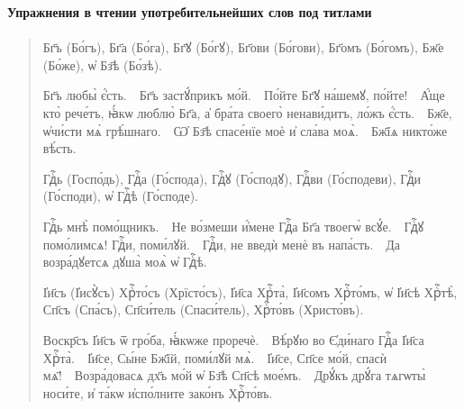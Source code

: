 \documentclass[11pt,a4paper,oneside]{memoir}
\newcommand{\exercise}{}
\newcommand{\exquote}{quote}
\newcommand{\pstyle}{\textenglish}
\newcommand{\pxp}[1]{\pstyle{(}#1\pstyle{)}}
\newcommand{\sdash}{\textenglish{\textemdash}}
\begin{document}
        \textbf{Упражнения в чтении употребительнейших слов под титлами}

        \paragraph{\exercise}

        \begin{\exquote}
          \begin{slv}
            Бг҃ъ \pxp{Бо́гъ}, Бг҃а \pxp{Бо́га}, Бг҃ꙋ \pxp{Бо́гꙋ},
            Бг҃ови \pxp{Бо́гови}, Бг҃омъ \pxp{Бо́гомъ}, Бж҃е
            \pxp{Бо́же}, ѡ҆ Бз҃ѣ \pxp{Бо́зѣ}.

            Бг҃ъ любы̀ є҆́сть.~\sdash~Бг҃ъ застꙋ́прикъ
            мо́й.~\sdash~По́йте Бг҃ꙋ на́шемꙋ, по́йте!~\sdash~А҆́ще
            кто̀ рече́тъ, ꙗ҆́кѡ люблю̀ Бг҃а, а҆ бра́та своего̀
            ненави́дитъ, ло́жъ є҆́сть.~\sdash~Бж҃е, ѡ҆чи́сти мѧ̀
            грѣ́шнаго.~\sdash~Ѡ҆ Бз҃ѣ спасе́нїе моѐ и҆ сла́ва
            моѧ̀.~\sdash~Бж҃їѧ никто́же вѣ́сть.

            Гдⷭ҇ь \pxp{Госпо́дь}, Гдⷭ҇а \pxp{Го́спода}, Гдⷭ҇ꙋ
            \pxp{Го́сподꙋ}, Гдⷭ҇ви \pxp{Го́сподеви}, Гдⷭ҇и
            \pxp{Го́споди}, ѡ҆ Гдⷭ҇ѣ \pxp{Го́споде}.

            Гдⷭ҇ь мнѣ̀ помо́щникъ.~\sdash~Не во́змеши и҆́мене Гдⷭ҇а
            Бг҃а твоегѡ̀ всꙋ́е.~\sdash~Гдⷭ҇ꙋ помо́лимсѧ! Гдⷭ҇и,
            поми́лꙋй.~\sdash~Гдⷭ҇и, не введѝ менѐ въ
            напа́сть.~\sdash~Да возра́дꙋетсѧ дꙋша̀ моѧ̀ ѡ҆ Гдⷭ҇ѣ.

            І҆и҃съ \pxp{І҆исꙋ̀съ} Хрⷭ҇то́съ \pxp{Хрїсто́съ}, І҆и҃са
            Хрⷭ҇та̀, І҆и҃сомъ Хрⷭ҇то́мъ, ѡ҆ І҆и҃сѣ Хрⷭ҇тѣ̀, Сп҃съ
            \pxp{Спа́съ}, Сп҃си́тель \pxp{Спаси́тель}, Хрⷭ҇то́въ
            \pxp{Христо́въ}.

            Воскр҃съ І҆и҃съ ѿ гро́ба, ꙗ҆́кѡже проречѐ.~\sdash~Вѣ́рꙋю
            во Є҆ди́наго Гдⷭ҇а І҆и҃са Хрⷭ҇та̀.~\sdash~І҆и҃се, Сы́не
            Бж҃їй, поми́лꙋй мѧ̀.~\sdash~І҆и҃се, Сп҃се мо́й, спасѝ
            мѧ҃!~\sdash~Возра́довасѧ дх҃ъ мо́й ѡ҆ Бз҃ѣ Сп҃сѣ
            мое́мъ.~\sdash~Дрꙋ́къ дрꙋ́га тѧгѡты̀ носи́те, и҆ та́кѡ
            и҆спо́лните зако́нъ Хрⷭ҇то́въ.
          \end{slv}
        \end{\exquote}

        \paragraph{\exercise}
\end{document}
